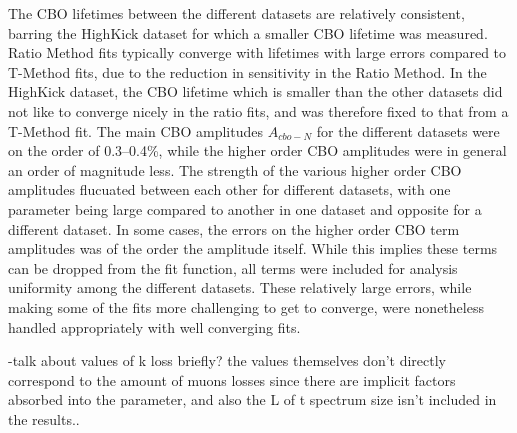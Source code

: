 The CBO lifetimes between the different datasets are relatively consistent, barring the HighKick dataset for which a smaller CBO lifetime was measured. Ratio Method fits typically converge with lifetimes with large errors compared to T-Method fits, due to the reduction in sensitivity in the Ratio Method. In the HighKick dataset, the CBO lifetime which is smaller than the other datasets did not like to converge nicely in the ratio fits, and was therefore fixed to that from a T-Method fit. The main CBO amplitudes $A_{cbo-N}$ for the different datasets were on the order of 0.3--0.4\%, while the higher order CBO amplitudes were in general an order of magnitude less. The strength of the various higher order CBO amplitudes flucuated between each other for different datasets, with one parameter being large compared to another in one dataset and opposite for a different dataset. In some cases, the errors on the higher order CBO term amplitudes was of the order the amplitude itself. While this implies these terms can be dropped from the fit function, all terms were included for analysis uniformity among the different datasets. These relatively large errors, while making some of the fits more challenging to get to converge, were nonetheless handled appropriately with well converging fits.



-talk about values of k loss briefly? the values themselves don't directly correspond to the amount of muons losses since there are implicit factors absorbed into the parameter, and also the L of t spectrum size isn't included in the results..



